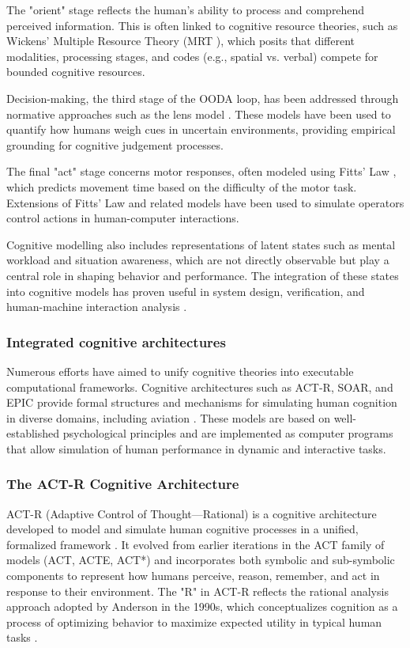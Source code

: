 \documentclass[12pt,a4paper]{article} %
\begin{document}
	The "orient" stage reflects the human's ability to process and comprehend perceived information. This is often linked to cognitive resource theories, such as Wickens' Multiple Resource Theory (MRT \cite{wickens_processing_1991}), which posits that different modalities, processing stages, and codes (e.g., spatial vs. verbal) compete for bounded cognitive resources.

	Decision-making, the third stage of the OODA loop, has been addressed through normative approaches such as the lens model \parencite{brunswik_conceptual_1952}. These models have been used to quantify how humans weigh cues in uncertain environments, providing empirical grounding for cognitive judgement processes.

	The final "act" stage concerns motor responses, often modeled using Fitts' Law \parencite{fitts_information_1954}, which predicts movement time based on the difficulty of the motor task. Extensions of Fitts' Law and related models have been used to simulate operators control actions in human-computer interactions.

	Cognitive modelling also includes representations of latent states such as mental workload and situation awareness, which are not directly observable but play a central role in shaping behavior and performance. The integration of these states into cognitive models has proven useful in system design, verification, and human-machine interaction analysis \parencite{wang_survey_2023}.

	\subsubsection{Integrated cognitive architectures} Numerous efforts have aimed to unify cognitive theories into executable computational frameworks. Cognitive architectures such as ACT-R, SOAR, and EPIC provide formal structures and mechanisms for simulating human cognition in diverse domains, including aviation \parencite{kirlik_conceptual_2007}. These models are based on well-established psychological principles and are implemented as computer programs that allow simulation of human performance in dynamic and interactive tasks.

	\subsubsection{The ACT-R Cognitive Architecture}
	ACT-R (Adaptive Control of Thought—Rational) is a cognitive architecture developed to model and simulate human cognitive processes in a unified, formalized framework \parencite{anderson_integrated_2004}. It evolved from earlier iterations in the ACT family of models (ACT, ACTE, ACT*) and incorporates both symbolic and sub-symbolic components to represent how humans perceive, reason, remember, and act in response to their environment. The "R" in ACT-R reflects the rational analysis approach adopted by Anderson in the 1990s, which conceptualizes cognition as a process of optimizing behavior to maximize expected utility in typical human tasks \parencite{whitehill_understanding_2013}.
\end{document}
